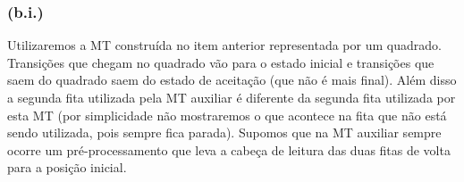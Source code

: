 \documentclass{article}
\begin{document}

\subsubsection{(b.i.)}

Utilizaremos a MT construída no item anterior representada por um quadrado. Transições que chegam no quadrado vão para o estado inicial e transições que saem do quadrado saem do estado de aceitação (que não é mais final). Além disso a segunda fita utilizada pela MT auxiliar é diferente da segunda fita utilizada por esta MT (por simplicidade não mostraremos o que acontece na fita que não está sendo utilizada, pois sempre fica parada). Supomos que na MT auxiliar sempre ocorre um pré-processamento que leva a cabeça de leitura das duas fitas de volta para a posição inicial.

\begin{center}
\end{center}
\end{document}
